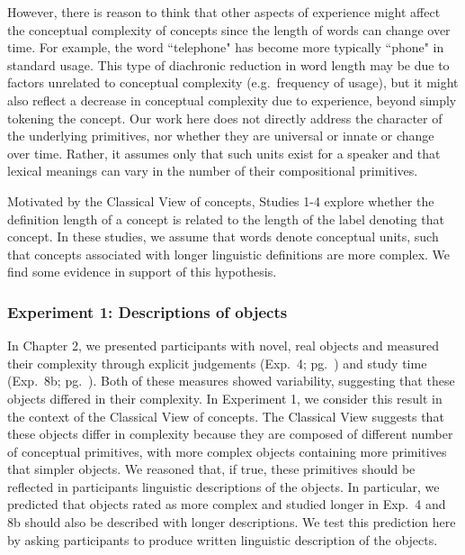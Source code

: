 However, there is reason to think that other aspects of experience might affect the conceptual complexity of concepts since the length of words can change over time. For example, the word ``telephone" has become more typically ``phone" in standard usage. This type of  diachronic reduction in word length may be due to factors  unrelated to conceptual complexity (e.g.\ frequency of usage), but it might also reflect a decrease in conceptual complexity due to experience, beyond simply tokening the concept. Our work here does not directly address the character of the underlying  primitives, nor whether they are universal or innate or change over time. Rather, it assumes only that such units exist for a speaker and that lexical meanings can vary in the number of their compositional primitives. 

Motivated by the Classical View of concepts, Studies 1-4  explore whether the definition length of a concept  is related to the length of the label denoting that concept. In these studies, we assume that words denote conceptual units, such that concepts associated with longer linguistic definitions are  more complex. We find some evidence in support of this hypothesis.









\subsubsection{Experiment 1: Descriptions of objects}
In Chapter 2, we presented participants with novel, real objects and measured their complexity through explicit judgements (Exp.\ 4; pg.\ \pageref{ch2-4}) and study time (Exp.\ 8b; pg.\ \pageref{ch2-8b}). Both of these measures showed variability, suggesting that these objects differed in their complexity. 
In Experiment 1, we consider this result in the context of the Classical View of concepts. The Classical View suggests that these objects differ in complexity because they are composed of different number of conceptual primitives, with more complex objects containing more primitives that simpler objects. We reasoned that, if true, these primitives should be reflected in participants linguistic descriptions of the objects. In particular, we predicted that objects rated as more complex and studied longer in Exp.\ 4 and 8b should also be described with longer descriptions. We test this prediction here by asking participants to produce written linguistic description of the objects.


